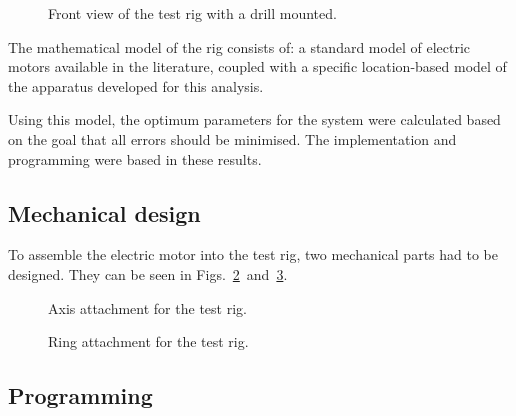 \documentclass[final]{beamer}
\begin{document}
\begin{frame}[t]{}
\begin{multicols}{3}
			\begin{figure}[h]
				\begin{center}
				\end{center}
				\caption{Front view of the test rig with a drill mounted. \label{fig:rig}}
			\end{figure}
			
			The mathematical model of the rig consists of: a standard model of electric motors
			available in the literature, coupled with a specific
			location-based model of the apparatus developed for this analysis.
			
			
			Using this model, the optimum parameters for the system were calculated
			based on the goal that all errors should be minimised.
			The implementation and programming were based in these results.
			
			\vfill
			\columnbreak
			
			\subsection{Mechanical design}
			To assemble the electric motor into the test rig, two mechanical
			parts had to be designed. They can be seen in Figs.~\ref{fig:axis:attach}~and~\ref{fig:ring:attach}.
			
			\begin{figure}[h]
				\begin{center}
					\caption{Axis attachment for the test rig. \label{fig:axis:attach}}
				\end{center}
			\end{figure}
			\begin{figure}[h]
				\begin{center}
					\caption{Ring attachment for the test rig. \label{fig:ring:attach}}
				\end{center}
			\end{figure}
			
			\subsection{Programming}
			

\end{multicols}
\end{frame}
\end{document}
